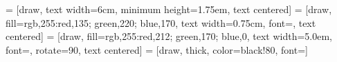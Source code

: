 
 = [draw, text width=6cm,  minimum height=1.75em, text centered]
 = [draw, fill={rgb,255:red,135; green,220; blue,170}, text width=0.75cm, font=\fontsize{6}{7.2}\sffamily, text centered]
 = [draw, fill={rgb,255:red,212; green,170; blue,0}, text width=5.0em, font=\fontsize{6}{7.2}\sffamily, rotate=90, text centered]
 = [draw, thick, color=black!80, font=\footnotesize\sffamily]
\usetikzlibrary{calc}

\newcommand{\background}[7]{%
    \begin{pgfonlayer}{background}
        \path (#1.west |- #2.north)+(-1,0.4) node (a1) {};
        \path (#3.east |- #4.south)+(+0.4,#5) node (a2) {};
        \path[fill=#6, draw=black!50]
        (a1) rectangle (a2);
        \path let \p{x}=(a1), \p{y}=($(a1)!0.5!(a2)$) in (\x{x}, \y{y})+(0.5,0) node (u1)[rotate=90]
        {#7};
\end{pgfonlayer}}

